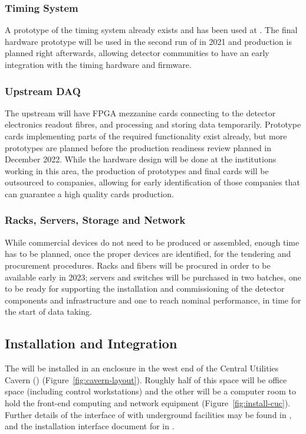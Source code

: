 \subsubsection{Timing System}
A prototype of the timing system already exists and has been used at . The final hardware prototype will be used in the second run of  in 2021 and production is planned right afterwards, allowing detector communities to have an early integration with the timing hardware and firmware.

\subsubsection{Upstream DAQ}
The upstream  will have FPGA mezzanine cards connecting to the detector electronics readout fibres, and processing and storing data temporarily. Prototype cards implementing parts of the required functionality exist already, but more prototypes are planned before the production readiness review planned in December 2022. While the hardware design will be done at the institutions working in this area, the production of prototypes and final cards will be outsourced to companies, allowing for early identification of those companies that can guarantee a high quality cards production.

\subsubsection{Racks, Servers, Storage and Network}
While commercial devices do not need to be produced or assembled, enough time has to be planned, once the proper devices are identified, for the tendering and procurement procedures. Racks and fibers will be procured in order to be available early in 2023; servers and switches will be purchased in two batches, one to be ready for supporting the installation and commissioning of the detector components and  infrastructure and one to reach nominal performance, in time for the start of data taking.

\subsection{Installation and Integration}


The  will be installed in an enclosure in the west end of the Central
Utilities Cavern () (Figure~\ref{fig:cavern-layout}).  Roughly
half of this space will be office space (including control
workstations) and the other will be a computer room to hold the 
front-end computing and network equipment (Figure~\ref{fig:install-cuc}). Further details of the interface of  with underground facilities
may be found in , and the installation interface document for  in .

